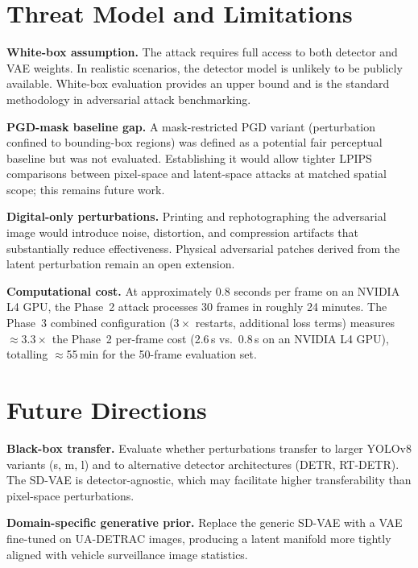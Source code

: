 \documentclass[12pt,a4paper]{report}
\begin{document}
\section{Threat Model and Limitations}
\label{sec:limitations}

\textbf{White-box assumption.}
The attack requires full access to both detector and VAE weights. In realistic scenarios,
the detector model is unlikely to be publicly available. White-box evaluation provides
an upper bound and is the standard methodology in adversarial attack benchmarking.

\textbf{PGD-mask baseline gap.}
A mask-restricted PGD variant (perturbation confined to bounding-box regions)
was defined as a potential fair perceptual baseline but was not evaluated.
Establishing it would allow tighter LPIPS comparisons between pixel-space and
latent-space attacks at matched spatial scope; this remains future work.

\textbf{Digital-only perturbations.}
Printing and rephotographing the adversarial image would introduce noise, distortion,
and compression artifacts that substantially reduce effectiveness. Physical adversarial
patches \cite{brown2017patch} derived from the latent perturbation remain an open
extension.

\textbf{Computational cost.}
At approximately 0.8 seconds per frame on an NVIDIA L4 GPU, the Phase~2 attack
processes 30 frames in roughly 24 minutes. The Phase~3 combined configuration ($3\times$ restarts, additional loss terms)
measures $\approx3.3\times$ the Phase~2 per-frame cost (2.6\,s vs.\ 0.8\,s on
an NVIDIA L4 GPU), totalling $\approx$55\,min for the 50-frame evaluation set.

\section{Future Directions}
\label{sec:future}

\textbf{Black-box transfer.}
Evaluate whether perturbations transfer to larger YOLOv8 variants (s, m, l) and
to alternative detector architectures (DETR, RT-DETR). The SD-VAE is detector-agnostic,
which may facilitate higher transferability than pixel-space perturbations.

\textbf{Domain-specific generative prior.}
Replace the generic SD-VAE with a VAE fine-tuned on UA-DETRAC images, producing a
latent manifold more tightly aligned with vehicle surveillance image statistics.
\end{document}
